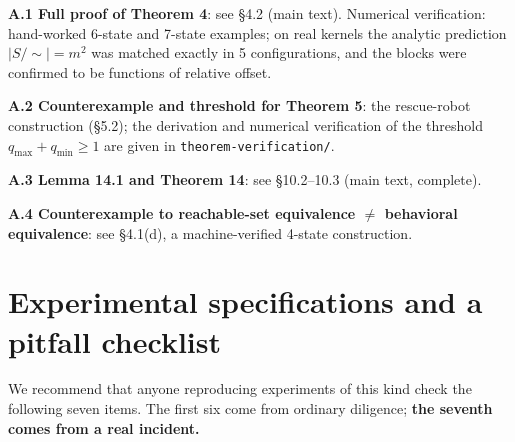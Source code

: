 \documentclass[11pt]{article}
\begin{document}
\textbf{A.1 Full proof of Theorem 4}: see \S{}4.2 (main text). Numerical verification: hand-worked 6-state and 7-state examples; on real kernels the analytic prediction \(|S/\!\sim|=m^2\) was matched exactly in 5 configurations, and the blocks were confirmed to be functions of relative offset.

\textbf{A.2 Counterexample and threshold for Theorem 5}: the rescue-robot construction (\S{}5.2); the derivation and numerical verification of the threshold \(q_{\max}+q_{\min}\ge1\) are given in \texttt{theorem-verification/}.

\textbf{A.3 Lemma 14.1 and Theorem 14}: see \S{}10.2--10.3 (main text, complete).

\textbf{A.4 Counterexample to reachable-set equivalence \(\ne\) behavioral equivalence}: see \S{}4.1(d), a machine-verified 4-state construction.

\hypertarget{experimental-specifications-and-a-pitfall-checklist}{%
\section{Experimental specifications and a pitfall checklist}\label{experimental-specifications-and-a-pitfall-checklist}}

We recommend that anyone reproducing experiments of this kind check the following seven items. The first six come from ordinary diligence; \textbf{the seventh comes from a real incident.}
\end{document}
